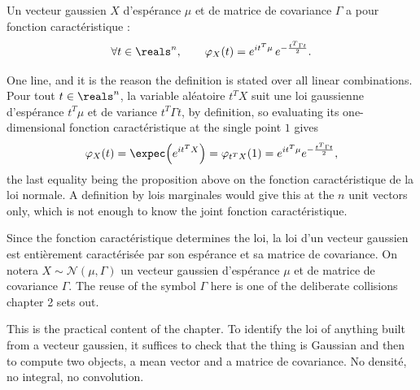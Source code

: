 \begin{theorem}
Un vecteur gaussien $X$ d'espérance $\mu$ et de matrice de covariance $\Gamma$ a
pour fonction caractéristique :
\[
  \forall t \in \reals^{n}, \qquad
  \varphi_{X}(t) = e^{it^{T}\mu}\, e^{-\frac{t^{T}\Gamma t}{2}} .
\]
\end{theorem}

\begin{remark}
One line, and it is the reason the definition is stated over all linear
combinations. Pour tout $t \in \reals^{n}$, la variable aléatoire $t^{T}X$ suit
une loi gaussienne d'espérance $t^{T}\mu$ et de variance $t^{T}\Gamma t$, by
definition, so evaluating its one-dimensional fonction caractéristique at the
single point $1$ gives
\[
  \varphi_{X}(t) = \expec\!\left(e^{it^{T}X}\right) = \varphi_{t^{T}X}(1)
                 = e^{it^{T}\mu}e^{-\frac{t^{T}\Gamma t}{2}} ,
\]
the last equality being the proposition above on the fonction caractéristique
de la loi normale. A definition by lois marginales
would give this at the $n$ unit vectors only, which is not enough to know the
joint fonction caractéristique.
\end{remark}

\begin{notation}
Since the fonction caractéristique determines the loi, la loi d'un vecteur
gaussien est entièrement caractérisée par son espérance et sa matrice de
covariance. On notera $X \sim \mathcal{N}(\mu,\Gamma)$ un vecteur gaussien
d'espérance $\mu$ et de matrice de covariance $\Gamma$. The reuse of the symbol
$\Gamma$ here is one of the deliberate collisions chapter 2 sets out.
\end{notation}

This is the practical content of the chapter. To identify the loi of
anything built from a vecteur gaussien, it suffices to check that the thing is
Gaussian and then to compute two objects, a mean vector and a matrice de
covariance. No densité, no integral, no convolution.

